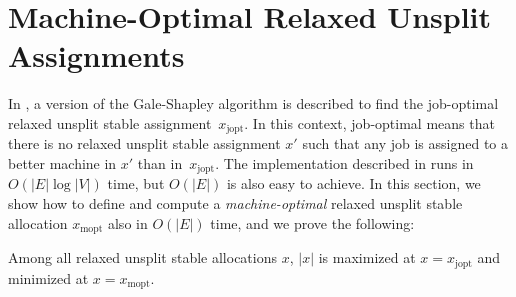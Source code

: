 \documentclass{llncs}
\begin{document}
\section{Machine-Optimal Relaxed Unsplit Assignments}
\label{sec:jmopt}

In \cite{dean_unsplit}, a version of the Gale-Shapley algorithm is
described to find the job-optimal relaxed unsplit stable
assignment~$x_{\text{jopt}}$.  In this context, job-optimal means that
there is no relaxed unsplit stable assignment $x'$ such that any job
is assigned to a better machine in $x'$ than in~$x_{\text{jopt}}$.
The implementation described in \cite{dean_unsplit} runs in $O(|E|
\log |V|)$ time, but $O(|E|)$ is also easy to achieve.  In this
section, we show how to define and compute a \emph{machine-optimal}
relaxed unsplit stable allocation $x_{\text{mopt}}$ also in $O(|E|)$
time, and we prove the following:

\begin{theorem}
\label{thm:card}
Among all relaxed unsplit stable allocations $x$, $|x|$ is maximized
at $x = x_{\text{jopt}}$ and minimized at $x = x_{\text{mopt}}$.
\end{theorem}
\end{document}
